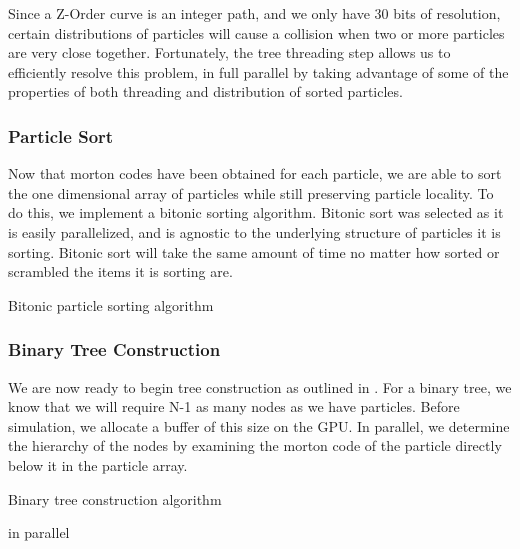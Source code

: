 \documentclass{thesis}
\begin{document}
Since a Z-Order curve is an integer path, and we only have 30 bits of resolution, certain distributions of particles will cause a collision when two or more particles are very close together. Fortunately, the tree threading step allows us to efficiently resolve this problem, in full parallel by taking advantage of some of the properties of both threading and distribution of sorted particles.
\subsubsection{Particle Sort}
Now that morton codes have been obtained for each particle, we are able to sort the one dimensional array of particles while still preserving particle locality. To do this, we implement a bitonic sorting algorithm. Bitonic sort was selected as it is easily parallelized, and is agnostic to the underlying structure of particles it is sorting. Bitonic sort will take the same amount of time no matter how sorted or scrambled the items it is sorting are.
\begin{algorithm}
    \label{alg:BitonicParticleSort}
    \caption{Bitonic particle sorting algorithm}
    \begin{algorithmic}
        \EndFor
    \end{algorithmic}
\end{algorithm}
\subsubsection{Binary Tree Construction}
We are now ready to begin tree construction as outlined in \cite{Karas:2012}. For a binary tree, we know that we will require N-1 as many nodes as we have particles. Before simulation, we allocate a buffer of this size on the GPU. In parallel, we determine the hierarchy of the nodes by examining the morton code of the particle directly below it in the particle array.
\begin{algorithm}
    \label{alg:BinaryTreeConstruction}
    \caption{Binary tree construction algorithm}
    \begin{algorithmic}
         in parallel
        \EndFor
    \end{algorithmic}
\end{algorithm}
\end{document}
